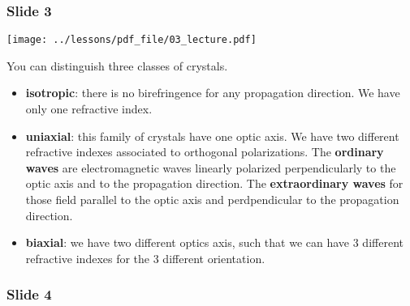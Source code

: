 \documentclass[../main/main.tex]{subfiles}
\begin{document}
\subsubsection*{Slide 3}

\begin{minipage}[]{0.5\linewidth}
\centering
\texttt{[image: ../lessons/pdf\_file/03\_lecture.pdf]}
\end{minipage}
\hspace{0.3cm}\vspace{0.3cm}
\begin{minipage}[c]{0.47\linewidth}

You can distinguish three classes of crystals.
\begin{itemize}
\item \textbf{isotropic}: there is no birefringence for any propagation direction. We have only one refractive index.

\item \textbf{uniaxial}: this family of crystals have one optic axis. We have two different refractive indexes associated to orthogonal polarizations. The \textbf{ordinary waves} are electromagnetic waves linearly polarized perpendicularly to the optic axis and to the propagation direction. The \textbf{extraordinary waves} for those field parallel to the optic axis and perdpendicular to the propagation direction.

\item \textbf{biaxial}: we have two different optics axis, such that we can have 3 different refractive indexes for the 3 different orientation.

\end{itemize}
\end{minipage}

\newpage

\subsubsection*{Slide 4}
\end{document}
